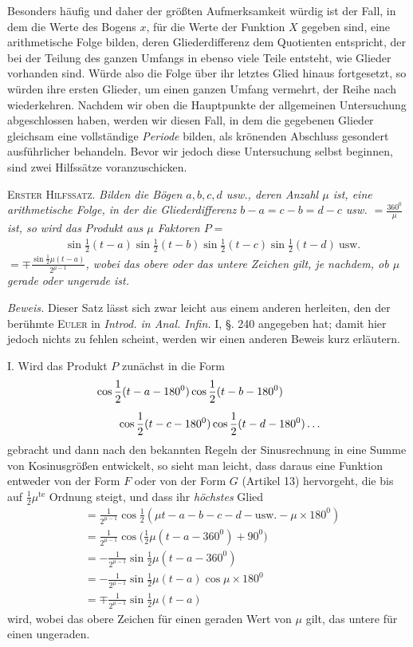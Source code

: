 \begingroup
\renewcommand{\arraystretch}{1.45}
Besonders häufig und daher der größten Aufmerksamkeit würdig ist der Fall, in dem
die Werte des Bogens \(x\), für die Werte der Funktion \(X\) gegeben sind, eine arithmetische Folge bilden, deren Gliederdifferenz dem Quotienten entspricht, der
bei der Teilung des ganzen Umfangs in ebenso viele Teile entsteht, wie Glieder vorhanden sind. Würde also
die Folge über ihr letztes Glied hinaus fortgesetzt, so würden ihre ersten Glieder, um einen ganzen Umfang vermehrt, der Reihe nach wiederkehren. Nachdem wir oben die Hauptpunkte der allgemeinen Untersuchung abgeschlossen haben, werden wir diesen Fall, in dem
die gegebenen Glieder gleichsam eine vollständige \emph{Periode} bilden, als krönenden Abschluss gesondert ausführlicher behandeln. Bevor wir jedoch diese Untersuchung selbst beginnen, sind zwei
Hilfssätze voranzuschicken.

\textsc{Erster Hilfssatz.} \emph{Bilden die Bögen \(a,b,c,d\) usw., deren Anzahl \(\mu\) ist,
eine arithmetische Folge, in der die Gliederdifferenz \(b-a=c-b=d-c\)
usw. \(=\frac{360^{0}}{\mu}\) ist, so wird das Produkt aus \(\mu\) Faktoren \(P=\)}
\[
\begin{aligned}
&\sin\frac12(t-a)\sin\frac12(t-b)\sin\frac12(t-c)\sin\frac12(t-d)\ \mathrm{usw.}
\end{aligned}
\]
\noindent\emph{\(=\mp\frac{\sin\frac12\mu(t-a)}{2^{\mu-1}}\), wobei das obere oder das untere Zeichen gilt, je nachdem, ob \(\mu\) gerade oder ungerade ist.}

\emph{Beweis.} Dieser Satz lässt sich zwar leicht aus einem anderen herleiten, den der berühmte \textsc{Euler} in \emph{Introd. in Anal. Infin.} I, \S. 240 angegeben hat; damit hier jedoch nichts zu fehlen scheint, werden wir einen anderen Beweis kurz erläutern.

I. Wird das Produkt \(P\) zunächst in die Form
\[
\begin{aligned}
&\cos\frac12(t-a-180^{0})\cos\frac12(t-b-180^{0})\\[5pt]&\qquad\cos\frac12(t-c-180^{0})\cos\frac12(t-d-180^{0})\mathinner{.\,.\,.}
\end{aligned}
\]
\noindent gebracht und dann nach den bekannten Regeln der Sinusrechnung in eine Summe von Kosinusgrößen entwickelt, so sieht man leicht, dass daraus eine Funktion entweder von der Form \(F\) oder von der Form \(G\)
(Artikel 13) hervorgeht, die bis auf \(\frac12\mu^{\mathrm{te}}\) Ordnung steigt, und dass ihr \emph{höchstes} Glied
\[
\begin{aligned}
&=\frac{1}{2^{\mu-1}}\cos\frac12(\mu t-a-b-c-d-\mathrm{usw.}-\mu\times180^{0})\\[5pt]
&=\frac{1}{2^{\mu-1}}\cos\bigl(\frac12\mu(t-a-360^{0})+90^{0}\bigr)\\[5pt]
&=-\frac{1}{2^{\mu-1}}\sin\frac12\mu(t-a-360^{0})\\[5pt]
&=-\frac{1}{2^{\mu-1}}\sin\frac12\mu(t-a)\cos\mu\times180^{0}\\[5pt]
&=\mp\frac{1}{2^{\mu-1}}\sin\frac12\mu(t-a)
\end{aligned}
\]
\noindent wird, wobei das obere Zeichen für einen geraden Wert von \(\mu\) gilt, das untere für einen ungeraden.

